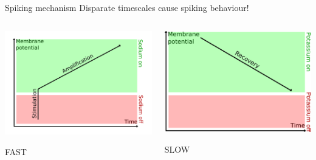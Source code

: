 \documentclass[presentation]{beamer}
\begin{document}
\begin{frame}[label={sec:org0890f32}]{Spiking mechanism}
Disparate timescales cause spiking behaviour!


\begin{columns}
\begin{column}{0.5\columnwidth}
\begin{center}
\includegraphics[width=.9\linewidth]{./fastsodium.png}
\end{center}

\begin{center}
FAST
\end{center}
\end{column}

\begin{column}{0.5\columnwidth}
\begin{center}
\includegraphics[width=.8\textwidth]{./slowpotassium.png}
\end{center}

\begin{center}
SLOW
\end{center}
\end{column}
\end{columns}
\end{frame}
\end{document}
